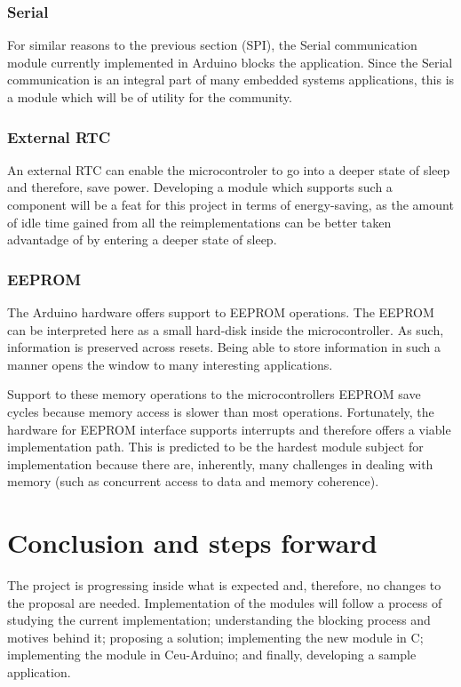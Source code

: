 \documentclass{article}
\begin{document}
\subsubsection{Serial}
\tab For similar reasons to the previous section (SPI), the Serial communication module currently implemented in Arduino blocks the application. Since the Serial communication is an integral part of many embedded systems applications, this is a module which will be of utility for the community.
\subsubsection{External RTC}
\tab An external RTC can enable the microcontroler to go into a deeper state of sleep and therefore, save power. Developing a module which supports such a component will be a feat for this project in terms of energy-saving, as the amount of idle time gained from all the reimplementations can be better taken advantadge of by entering a deeper state of sleep.
\subsubsection{EEPROM}
\tab The Arduino hardware offers support to EEPROM operations. The EEPROM can be interpreted here as a small hard-disk inside the microcontroller. As such, information is preserved across resets. Being able to store information in such a manner opens the window to many interesting applications. 
\par Support to these memory operations to the microcontrollers EEPROM save cycles because memory access is slower than most operations. Fortunately, the hardware for EEPROM interface supports interrupts and therefore offers a viable implementation path. This is predicted to be the hardest module subject for implementation because there are, inherently, many challenges in dealing with memory (such as concurrent access to data and memory coherence).

\section{Conclusion and steps forward}
\tab The project is progressing inside what is expected and, therefore, no changes to the proposal are needed. Implementation of the modules will follow a process of studying the current implementation; understanding the blocking process and motives behind it; proposing a solution; implementing the new module in C; implementing the module in Ceu-Arduino; and finally, developing a sample application.

\printbibliography[title=Referências]
\end{document}
